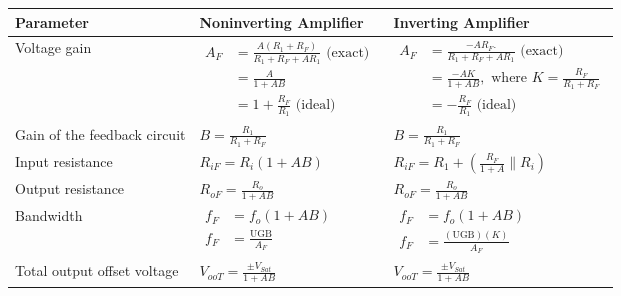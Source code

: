    \begin{table}[H]
   	\centering
   	\renewcommand*{\arraystretch}{1.9}
   	\begin{tabular}{|p{4cm}|p{5.5cm}|p{5.5cm}|}
   		\hline
   		
   		\textbf{	Parameter}\newline  &\textbf{Noninverting Amplifier}\newline &\textbf{Inverting Amplifier}\newline\\\hline
   		Voltage gain& $\begin{aligned}
   		A_{F}  &=\frac{A\left(R_{1}+R_{F}\right)}{R_{1}+R_{F}+A R_{1}} \text { (exact) }\\
   		&=\frac{A}{1+A B}\\
   		&=1+\frac{R_{F}}{R_{1}} \text { (ideal) }
   		\end{aligned}$  & $\begin{aligned}
   		A_{F}  &=\frac{-A R_{F} .}{R_{1}+R_{F}+A R_{1}} \text { (exact) }\\
   		&=\frac{-A K}{1+A B}, \text { where } K=\frac{R_{F}}{R_{1}+R_{F}}\\
   		&=-\frac{R_{F}}{R_{1}} \text { (ideal) }
   		\end{aligned}$ \\\hline
   		Gain of the feedback circuit& $\left. \right.B=\frac{R_{1}}{R_{1}+R_{F}}$ & $\left. \right.B=\frac{R_{1}}{R_{1}+R_{F}}$\\\hline
   		Input resistance& $\left. \right. R_{i F}=R_{i}(1+A B)$ & $\left. \right. R_{i F}=R_{1}+\left(\frac{R_{F}}{1+A} \| R_{i}\right)$ \\\hline
   		Output resistance  & $ \left. \right. R_{o F}=\frac{R_{o}}{1+A B} $&$\left. \right. R_{o F}=\frac{R_{o}}{1+A B}$ \\\hline
   		Bandwidth&$\begin{aligned}
   		f_{F}&=f_{o}(1+A B)\\
   		f_{F}&=\frac{\mathrm{UGB}}{A_{F}}
   		\end{aligned}$ &$\begin{aligned}
   		f_{F}&=f_{o}(1+A B)\\
   		f_{F}&=\frac{(\mathrm{UGB})(K)}{A_{F}}
   		\end{aligned}$ \\\hline
   		Total output offset voltage&$\left. \right.V_{ooT}=\frac{\pm V_{Sat}}{1+AB}$ &$\left. \right.V_{ooT}=\frac{\pm V_{Sat}}{1+AB}$ \\\hline
   	\end{tabular}
   \end{table}
